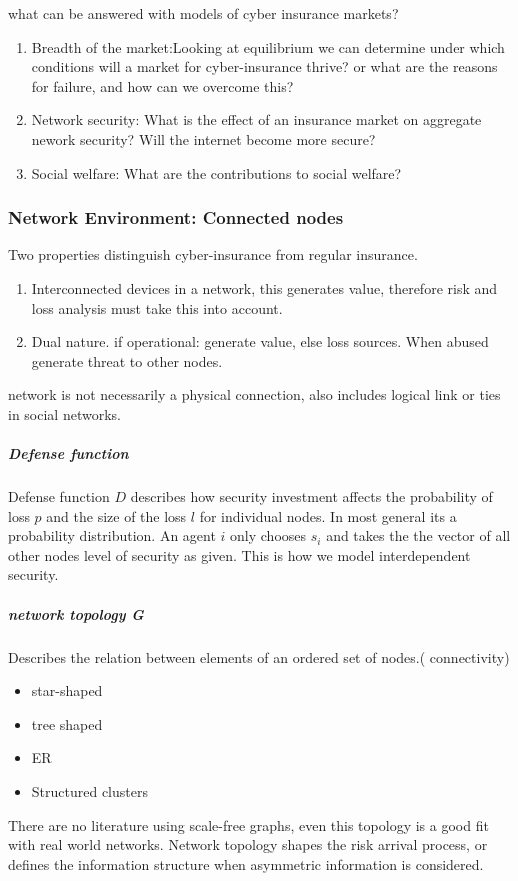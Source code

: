what can be answered with models of cyber insurance markets?

\begin{enumerate}
\item Breadth of the market:Looking at equilibrium we can determine under which conditions will a market for
 cyber-insurance thrive? or what are the reasons for failure, and how can we overcome this?
\item Network security: What is the effect of an insurance market on aggregate nework security? Will the internet become more secure?
\item Social welfare: What are the contributions to social welfare?

\end{enumerate}

\subsubsection{Network Environment: Connected nodes}
Two properties distinguish cyber-insurance from regular insurance.
\begin{enumerate}
\item Interconnected devices in a network, this generates value, therefore risk and loss analysis must take this into account. 
\item Dual nature. if operational: generate value, else loss sources. When abused generate threat to other nodes.
\end{enumerate}
network is not necessarily  a physical connection, also includes logical link or ties in social networks.
\subparagraph{Defense function}
Defense function $D$ describes how security investment affects the probability of loss $p $ and the size of the loss  $l $ for individual nodes.  In most general its a probability distribution.
An agent $i$ only chooses $s_{i}$ 
and takes the the vector of all other nodes level of security as given. 
This is how we model interdependent security. 

\subparagraph{network topology G}
Describes the relation between elements of an ordered set of nodes.( connectivity)
\begin{itemize}[topsep=-1em,parsep=0em,itemsep=0em] 
\item star-shaped \item tree shaped \item ER \item Structured clusters
\end{itemize}
There are no literature using scale-free graphs, even this topology is a good fit with real world networks.
Network topology shapes the risk arrival process, or defines the information structure when asymmetric
 information is considered.

